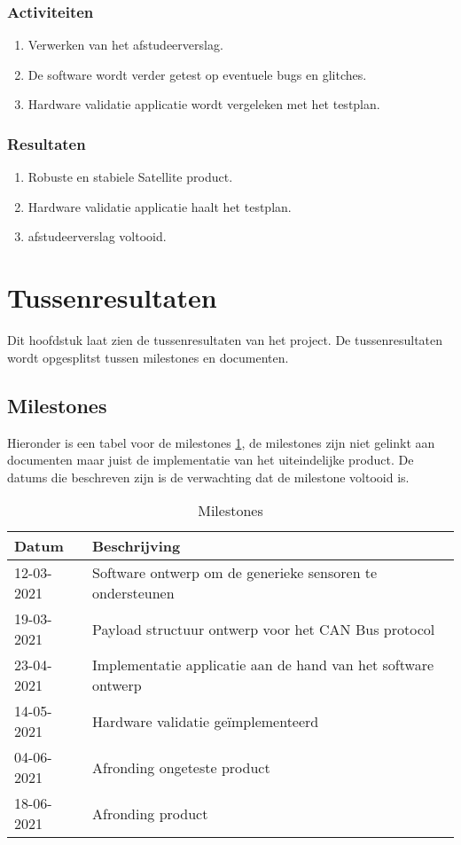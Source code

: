 \subsubsection{Activiteiten}
\begin{enumerate}
	\item Verwerken van het afstudeerverslag.
	\item De software wordt verder getest op eventuele bugs en glitches.
	\item Hardware validatie applicatie wordt vergeleken met het testplan.
\end{enumerate}

\subsubsection{Resultaten}
\begin{enumerate}
	\item Robuste en stabiele Satellite product.
	\item Hardware validatie applicatie haalt het testplan.
	\item afstudeerverslag voltooid.
\end{enumerate}

\newpage
\section{Tussenresultaten}
Dit hoofdstuk laat zien de tussenresultaten van het project. De tussenresultaten wordt opgesplitst tussen milestones en documenten.

\subsection{Milestones}
Hieronder is een tabel voor de milestones \ref{tab:milestones}, de milestones zijn niet gelinkt aan documenten maar juist de implementatie van het uiteindelijke product. De datums die beschreven zijn is de verwachting dat de milestone voltooid is.
\begin{table}[h!]
		\caption{Milestones}
		\begin{tabular}{p{3cm}p{12cm}}
		\toprule
		\textbf{Datum}      & \textbf{Beschrijving} \\ \midrule
		12-03-2021 & Software ontwerp om de generieke sensoren te ondersteunen      \\
		19-03-2021 & Payload structuur ontwerp voor het CAN Bus protocol      \\
		23-04-2021 & Implementatie applicatie aan de hand van het software ontwerp					\\
		14-05-2021 & Hardware validatie geïmplementeerd		\\
		04-06-2021 & Afronding ongeteste product \\
		18-06-2021 & Afronding product              \\ \bottomrule
		\end{tabular}

	\label{tab:milestones}
\end{table}

